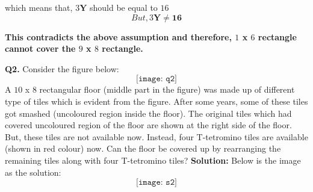 \documentclass{article}
\begin{document}
\begin{flushleft}
\begin{itemize}
    \begin{center}
         which means that, $3\textbf{Y}$ should be equal to $16$
        \[But, 3\textbf{Y} \neq \textbf{16} \]

        \textbf{This contradicts the above assumption and therefore, $1$ x $6$ rectangle cannot cover the $9$ x $8$ rectangle.}
    \end{center}



\end{itemize}



\end{flushleft}

\newpage
\begin{flushleft}
\textbf{Q2. } Consider the figure below:
\[\texttt{[image: q2]}\]
\newline
A $10$ x $8$ rectangular floor (middle part in the figure) was made up of different type of tiles which is evident from the figure. After some years, some of these tiles got smashed (uncoloured region inside the floor). The original tiles which had covered uncoloured region of the floor are shown at the right side of the floor. But, these tiles are not available now. Instead, four T-tetromino tiles are available (shown in red colour) now.
Can the floor be covered up by rearranging the remaining tiles along with four T-tetromino tiles?
\newline
\newline
\textbf{Solution:} Below is the image as the solution:
\[\texttt{[image: s2]}\]
\end{flushleft}
\end{document}
